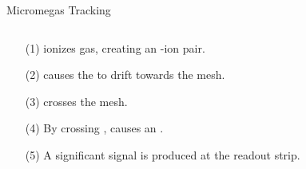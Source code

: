 \begin{frame}{Micromegas Tracking}
    \label{20.07::micromegas_tracking}

    \vspace{18pt}

    \begin{columns}[onlytextwidth,T]
        \begin{column}{.34\linewidth}
            \begin{enumerate}
                \item[(1)]
                     ionizes gas, creating an -ion pair.

                \vspace{2pt}
                \item[(2)]
                     causes the  to drift towards the mesh.

                \vspace{2pt}
                \item[(3)]
                     crosses the mesh.

                \vspace{2pt}
                \item[(4)]
                    By crossing ,  causes an .

                \vspace{2pt}
                \item[(5)]
                    A significant signal is produced at the readout strip.
            \end{enumerate}
        \end{column}

        \begin{column}{.64\linewidth}
            \vspace{0pt}
            \begin{center}
            \end{center}
        \end{column}
    \end{columns}

\end{frame}
